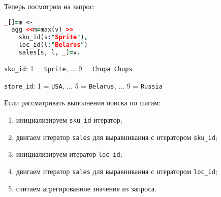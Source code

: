 Теперь посмотрим на запрос:

\begin{lstlisting}[language=Prolog]
_[]=m <-
  agg <<m=max(v) >>
    sku_id(s:"Sprite"),
    loc_id(l:"Belarus")
    sales[s, l, _]=v.
\end{lstlisting}

\lstinline{sku_id}: 1 = \lstinline{Sprite}, ... 9 = \lstinline{Chupa Chups}

\lstinline{store_id}: 1 = \lstinline{USA}, ... 5 = \lstinline{Belarus}, ... 9 = \lstinline{Russia}

Если рассматривать выполнения поиска по шагам:

\begin{enumerate}
  \item инициализируем \lstinline{sku_id} итератор;
  \item двигаем итератор \lstinline{sales} для выравнивания с итератором \lstinline{sku_id};
  \item инициализируем итератор \lstinline{loc_id};
  \item двигаем итератор \lstinline{sales} для выравнивания с итератором \lstinline{loc_id};
  \item считаем агрегированное значение из запроса.
\end{enumerate}
